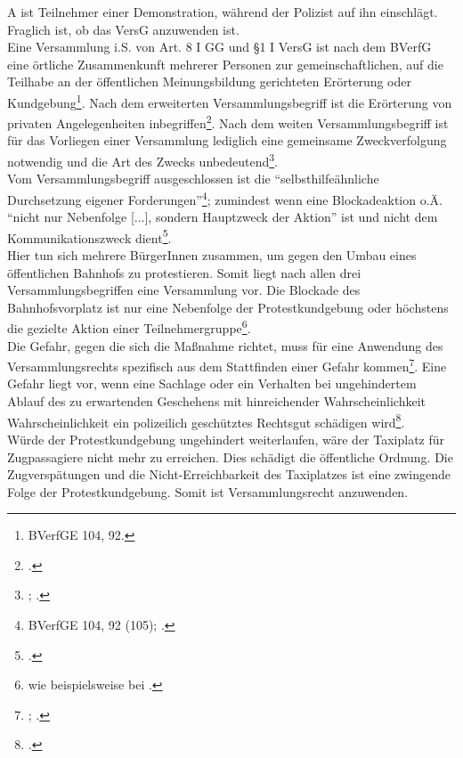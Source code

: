 \documentclass[widefront, ngerman]{jura}
\begin{document}
A ist Teilnehmer einer Demonstration, während der Polizist auf ihn einschlägt. Fraglich ist, ob das VersG anzuwenden ist.\\
Eine Versammlung i.S. von Art. 8 I GG und §1 I VersG ist nach dem BVerfG eine örtliche Zusammenkunft mehrerer Personen zur gemeinschaftlichen, auf die Teilhabe an der öffentlichen Meinungsbildung gerichteten Erörterung oder Kundgebung\footnote{BVerfGE 104, 92.}. Nach dem erweiterten Versammlungsbegriff ist die Erörterung von privaten Angelegenheiten inbegriffen\footcite[Kunig][Art. 8 Rn. 17]{MuenchKunig1}. 
Nach dem weiten Versammlungsbegriff ist für das Vorliegen einer Versammlung lediglich eine gemeinsame Zweckverfolgung notwendig und die Art des Zwecks unbedeutend\footnote{\cite[Schulze-Fielitz][Art. 8 Rn 23ff.]{DreierGG1}; \cite[Rn 752ff.]{PierothSchlinkGG}. }. \\
Vom Versammlungsbegriff ausgeschlossen ist die "`selbsthilfeähnliche Durchsetzung eigener Forderungen"'\footnote{BVerfGE 104, 92 (105); \cite[§15 Rn 195]{DietelGintzelKniesel}.}; zumindest wenn eine Blockadeaktion o.Ä. "`nicht nur Nebenfolge [...], sondern Hauptzweck der Aktion"' ist und nicht dem Kommunikationszweck dient\footcite[S.122ff.]{schwaeble}.\\
Hier tun sich mehrere BürgerInnen zusammen, um gegen den Umbau eines öffentlichen Bahnhofs zu protestieren. Somit liegt nach allen drei Versammlungsbegriffen eine Versammlung vor. Die Blockade des Bahnhofsvorplatz ist nur eine Nebenfolge der Protestkundgebung oder höchstens die gezielte Aktion einer Teilnehmergruppe\footnote{wie beispielsweise bei \cite[§1 Rn 253]{DietelGintzelKniesel}.}.\\
Die Gefahr, gegen die sich die Maßnahme richtet, muss für eine Anwendung des Versammlungsrechts spezifisch aus dem Stattfinden einer Gefahr kommen\footnote{\cite[Rn 419]{Gusy}; \cite[§20 Rn 16]{PierothSchlinkPolizei}.}. Eine Gefahr liegt vor, wenn eine Sachlage oder ein Verhalten bei ungehindertem Ablauf des zu erwartenden Geschehens mit hinreichender Wahrscheinlichkeit Wahrscheinlichkeit ein polizeilich geschütztes Rechtsgut schädigen wird\footcite[§4 Rn 31]{PierothSchlinkPolizei}.\\
Würde der Protestkundgebung ungehindert weiterlaufen, wäre der Taxiplatz für Zugpassagiere nicht mehr zu erreichen. Dies schädigt die öffentliche Ordnung. Die Zugverspätungen und die Nicht-Erreichbarkeit des Taxiplatzes ist eine zwingende Folge der Protestkundgebung. Somit ist Versammlungsrecht anzuwenden.
\end{document}
